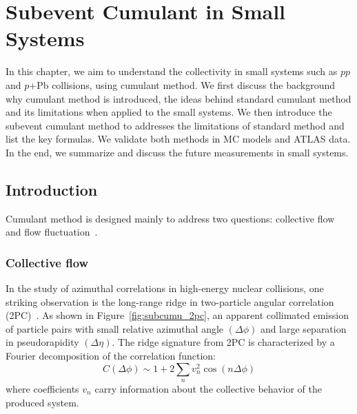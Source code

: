 \section{Subevent Cumulant in Small Systems}
\label{chapter:subcumu}

In this chapter, we aim to understand the collectivity in small systems such as $pp$ and $p$+Pb collisions, using cumulant method. We first discuss the background why cumulant method is introduced, the ideas behind standard cumulant method and its limitations when applied to the small systems. We then introduce the subevent cumulant method to addresses the limitations of standard method and list the key formulas. We validate both methods in MC models and ATLAS data. In the end, we summarize and discuss the future measurements in small systems.



\subsection{Introduction}

Cumulant method is designed mainly to address two questions: collective flow and flow fluctuation~\cite{Borghini:2000sa}.



\subsubsection{Collective flow}

In the study of azimuthal correlations in high-energy nuclear collisions, one striking observation is the long-range ridge in two-particle angular correlation (2PC)~\cite{Aaboud:2018ves}. As shown in Figure~\ref{fig:subcumu_2pc}, an apparent collimated emission of particle pairs with small relative azimuthal angle $(\Delta\phi)$ and large separation in pseudorapidity $(\Delta\eta)$. The ridge signature from 2PC is characterized by a Fourier decomposition of the correlation function:
\begin{equation}
C(\Delta\phi)\sim 1+2\sum_n v_n^2 \cos(n\Delta\phi)
\end{equation}
where coefficients $v_n$ carry information about the collective behavior of the produced system.

